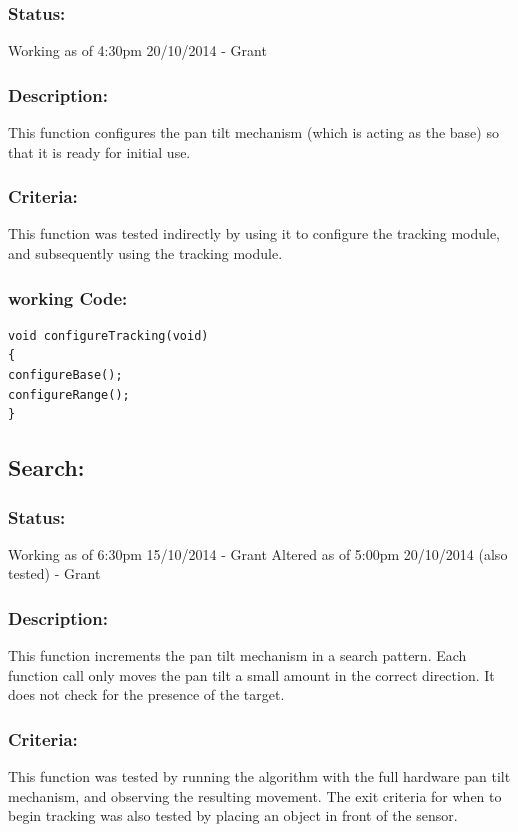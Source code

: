 \documentclass[]{report}
\begin{document}
\subsubsection{Status:}
Working as of 4:30pm 20/10/2014 - Grant

\subsubsection{Description:}
This function configures the pan tilt mechanism (which is acting as the base) so that it is ready for initial use.

\subsubsection{Criteria:}
This function was tested indirectly by using it to configure the tracking module, and subsequently using the tracking module.

\subsubsection{working Code:}
\begin{lstlisting}
void configureTracking(void)
{
configureBase();
configureRange();
}
\end{lstlisting}

\subsection{Search:}
\subsubsection{Status:}
Working as of 6:30pm 15/10/2014 - Grant \newline
Altered as of 5:00pm 20/10/2014 (also tested) - Grant

\subsubsection{Description:}
This function increments the pan tilt mechanism in a search pattern. Each function call only moves the pan tilt a small amount in the correct direction. It does not check for the presence of the target.

\subsubsection{Criteria:}
This function was tested by running the algorithm with the full hardware pan tilt mechanism, and observing the resulting movement. \newline
The exit criteria for when to begin tracking was also tested by placing an object in front of the sensor.
\end{document}

